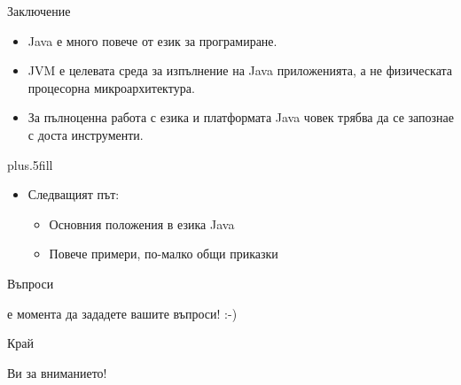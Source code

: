 \documentclass{beamer}
\begin{document}
\begin{frame}{Заключение}
  \transdissolve
  \begin{itemize}
  \item
    Java \alert{е много повече от език за програмиране}.
  \item
    JVM \alert{е целевата среда за изпълнение} на Java приложенията, а
    не физическата процесорна микроархитектура.
  \item
    За пълноценна работа с езика и платформата Java човек трябва да
    се запознае с доста инструменти.
  \end{itemize}
  
  \vskip0pt plus.5fill
  \begin{itemize}
  \item
    Следващият път:
    \begin{itemize}
    \item
      Основния положения в езика Java
    \item
      Повече примери, по-малко общи приказки
    \end{itemize}
  \end{itemize}
\end{frame}

\begin{frame}{Въпроси}
  \transdissolve
  \begin{center}
     е момента да зададете вашите въпроси! :-)
  \end{center}
\end{frame}

\begin{frame}{Край}
  \transdissolve
  \begin{center}
     Ви за вниманието!
  \end{center}
\end{frame}
\end{document}
